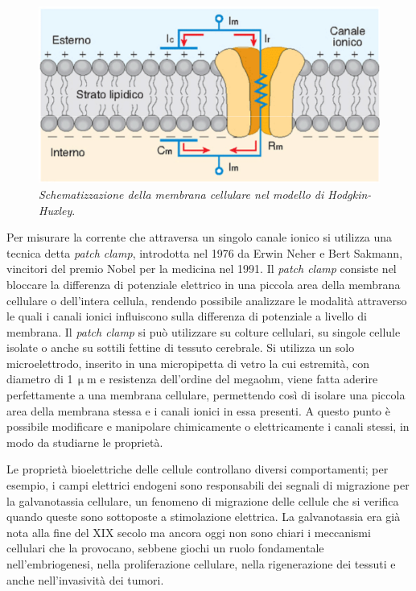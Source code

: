 \documentclass{report}
\numberwithin{equation}{section}
\numberwithin{figure}{section}
\begin{document}
\begin{figure}[htp]
    \centering
    \includegraphics[scale=0.7]{immagini/membrana.png}
    \caption{\label{fig:membrana} \textit{Schematizzazione della membrana cellulare nel modello di Hodgkin-Huxley}.}
\end{figure}

Per misurare la corrente che attraversa un singolo canale ionico si utilizza una tecnica detta \textit{patch clamp}, introdotta nel 1976 da Erwin Neher e Bert Sakmann, vincitori del premio Nobel per la medicina nel 1991. Il \textit{patch clamp} consiste nel bloccare la differenza di potenziale elettrico in una piccola area della membrana cellulare o dell'intera cellula, rendendo possibile analizzare le modalità attraverso le quali i canali ionici influiscono sulla differenza di potenziale a livello di membrana. Il \textit{patch clamp} si può utilizzare su colture cellulari, su singole cellule isolate o anche su sottili fettine di tessuto cerebrale. Si utilizza un solo microelettrodo, inserito in una micropipetta di vetro la cui estremità, con diametro di 1\,$\upmu$m e resistenza dell'ordine del megaohm, viene fatta aderire perfettamente a una membrana cellulare, permettendo così di isolare una piccola area della membrana stessa e i canali ionici in essa presenti. A questo punto è possibile modificare e manipolare chimicamente o elettricamente i canali stessi, in modo da studiarne le proprietà.

Le proprietà bioelettriche delle cellule controllano diversi comportamenti; per esempio, i campi elettrici endogeni sono responsabili dei segnali di migrazione per la galvanotassia cellulare, un fenomeno di migrazione delle cellule che si verifica quando queste sono sottoposte a stimolazione elettrica. La galvanotassia era già nota alla fine del XIX secolo ma ancora oggi non sono chiari i meccanismi cellulari che la provocano, sebbene giochi un ruolo fondamentale nell'embriogenesi, nella proliferazione cellulare, nella rigenerazione dei tessuti e anche nell'invasività dei tumori.
\end{document}
